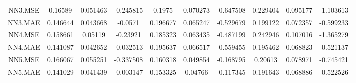 \begin{longtable}{cccccccccc}
\addlinespace
NN3.MSE & 0.16589 & 0.051463 & -0.245815 & 0.1975 & 0.070273 & -0.647508 & 0.229404 & 0.095177 & -1.103613\\
NN3.MAE & 0.146644 & 0.043668 & -0.0571 & 0.196677 & 0.065247 & -0.529679 & 0.199122 & 0.072357 & -0.599233\\
NN4.MSE & 0.158661 & 0.05119 & -0.23921 & 0.185323 & 0.063435 & -0.487199 & 0.242946 & 0.107016 & -1.365279\\
NN4.MAE & 0.141087 & 0.042652 & -0.032513 & 0.195637 & 0.066517 & -0.559455 & 0.195462 & 0.068823 & -0.521137\\
NN5.MSE & 0.166067 & 0.055251 & -0.337508 & 0.160318 & 0.049854 & -0.168795 & 0.20613 & 0.078971 & -0.745421\\
\addlinespace
NN5.MAE & 0.141029 & 0.041439 & -0.003147 & 0.153325 & 0.04766 & -0.117345 & 0.191643 & 0.068886 & -0.522526\\*
\end{longtable}
\endgroup{}